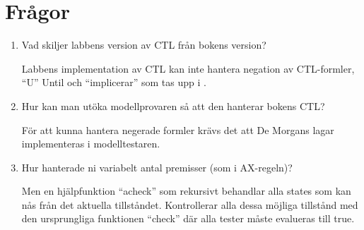 \section{Frågor}
\label{sub:fragor}

\renewcommand{\labelenumi}{(\alph{enumi})}
\begin{enumerate}
\item Vad skiljer labbens version av CTL från bokens version?

Labbens implementation av CTL kan inte hantera negation av CTL-formler, “U” Until och
“implicerar” som tas upp i \cite{huth}.

\item Hur kan man utöka modellprovaren så att den hanterar bokens CTL?

För att kunna hantera negerade formler krävs det att De Morgans lagar implementeras i
modelltestaren. 

\item Hur hanterade ni variabelt antal premisser (som i AX-regeln)?

Men en hjälpfunktion “acheck” som rekursivt behandlar alla states som kan nås från det aktuella tillståndet. Kontrollerar alla dessa möjliga tillstånd med den ursprungliga funktionen “check” där alla tester måste evalueras till true.

\end{enumerate}